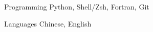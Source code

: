 


\begin{cvskills}


\cvskill
{Programming} %
{Python, Shell/Zsh, Fortran, Git} %



\cvskill
{Languages} %
{Chinese, English} %





\end{cvskills}